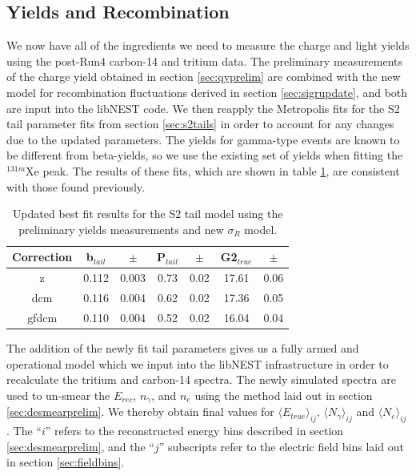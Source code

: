 \subsection{Yields and Recombination}\label{sec:qyfinal}
We now have all of the ingredients we need to measure the charge and light yields using the post-Run4 carbon-14 and tritium data. The preliminary measurements of the charge yield obtained in section \ref{sec:qyprelim} are combined with the new model for recombination fluctuations derived in section \ref{sec:sigrupdate}, and both are input into the libNEST code. We then reapply the Metropolis fits for the S2 tail parameter fits from section \ref{sec:s2tails} in order to account for any changes due to the updated parameters. The yields for gamma-type events are known to be different from beta-yields, so we use the existing set of yields when fitting the $^{131m}$Xe peak. The results of these fits, which are shown in table \ref{tab:s2bestfit_new}, are consistent with those found previously.
\begin{table}[h!]
\centering
    \begin{tabular}{ c | c | c | c | c | c | c }
    \hline
    Correction & b$_{tail}$ & $\pm$ & P$_{tail}$ & $\pm$  & G2$_{true}$ & $\pm$ \\
    \hline \hline
    z & 0.112 & 0.003 & 0.73 & 0.02 & 17.61 & 0.06\\
    \hline
    dcm & 0.116 & 0.004 & 0.62 & 0.02 & 17.36 & 0.05 \\
    \hline
    gfdcm & 0.110 & 0.004 & 0.52 & 0.02 & 16.04 & 0.04 \\
    \hline
    \end{tabular}
    \caption{Updated best fit results for the S2 tail model using the preliminary yields measurements and new $\sigma_R$ model.}
    \label{tab:s2bestfit_new}
\end{table}

The addition of the newly fit tail parameters gives us a fully armed and operational model which we input into the libNEST infrastructure in order to recalculate the tritium and carbon-14 spectra. The newly simulated spectra are used to un-smear the $E_{rec}$, $n_{\gamma}$, and $n_e$ using the method laid out in section \ref{sec:desmearprelim}. We thereby obtain final values for $\langle E_{true} \rangle_{ij}$, $\langle N_{\gamma} \rangle_{ij}$ and $\langle N_{e} \rangle_{ij}$. The ``$i$'' refers to the reconstructed energy bins described in section  \ref{sec:desmearprelim}, and the ``$j$'' subscripts refer to the electric field bins laid out in section \ref{sec:fieldbins}.

